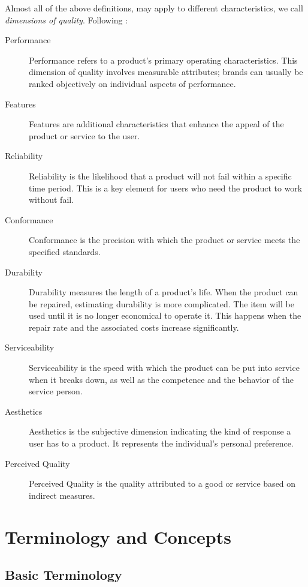 \documentclass[12pt,a4paper]{report}
\begin{document}
Almost all of the above definitions, may apply to different characteristics, we call \emph{dimensions of quality}. Following \cite{wikipedia_eight_2015} :
\begin{description}
\item [Performance] Performance refers to a product's primary operating characteristics. This dimension of quality involves measurable attributes; brands can usually be ranked objectively on individual aspects of performance.
\item [{Features}] Features are additional characteristics that enhance the appeal of the product or service to the user.
\item [{Reliability}] Reliability is the likelihood that a product will not fail within a specific time period. This is a key element for users who need the product to work without fail.
\item [{Conformance}] Conformance is the precision with which the product or service meets the specified standards.
\item [{Durability}] Durability measures the length of a product’s life. When the product can be repaired, estimating durability is more complicated. The item will be used until it is no longer economical to operate it. This happens when the repair rate and the associated costs increase significantly.
\item [{Serviceability}] Serviceability is the speed with which the product can be put into service when it breaks down, as well as the competence and the behavior of the service person.
\item [{Aesthetics}] Aesthetics is the subjective dimension indicating the kind of response a user has to a product. It represents the individual’s personal preference.
\item [{Perceived Quality}] Perceived Quality is the quality attributed to a good or service based on indirect measures.
\end{description}


\section{Terminology and Concepts}

\subsection{Basic Terminology}
\end{document}
